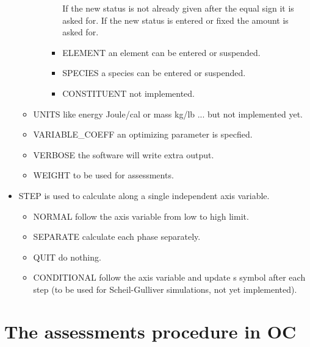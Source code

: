 \documentclass[12pt]{article}
\begin{document}
\begin{itemize}
\begin{itemize}
\begin{itemize}
\begin{itemize}
      If the new status is not already given after the equal sign it
      is asked for.  If the new status is entered or fixed the amount
      is asked for.
    \item ELEMENT an element can be entered or suspended.
    \item SPECIES a species can be entered or suspended.
    \item CONSTITUENT not implemented.
    \end{itemize}
    \end{itemize}
  \item UNITS like energy Joule/cal or mass kg/lb ... but not implemented yet.
  \item VARIABLE\_COEFF an optimizing parameter is specfied.
  \item VERBOSE the software will write extra output.
  \item WEIGHT to be used for assessments.
  \end{itemize}
\item STEP is used to calculate along a single independent axis
  variable.
  \begin{itemize}
  \item NORMAL follow the axis variable from low to high limit.
  \item SEPARATE calculate each phase separately.
  \item QUIT do nothing.
  \item CONDITIONAL follow the axis variable and update s symbol after
    each step (to be used for Scheil-Gulliver simulations, not yet
    implemented).
  \end{itemize}

\end{itemize}

\section{The assessments procedure in OC}\label{sc:ass}
\end{document}
